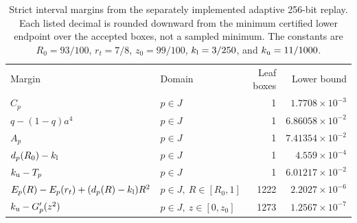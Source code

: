 \begin{table}[t]
\caption{Strict interval margins from the separately implemented adaptive 256-bit replay. Each listed decimal is rounded downward from the minimum certified lower endpoint over the accepted boxes, not a sampled minimum. The constants are $R_0=93/100$, $r_t=7/8$, $z_0=99/100$, $k_{\mathrm l}=3/250$, and $k_{\mathrm u}=11/1000$.}
\label{tab:certificate}
\begin{ruledtabular}
\begin{tabular}{llrr}
Margin & Domain & Leaf boxes & Lower bound \\
$C_p$ & $p\in J$ & 1 & $1.7708\times10^{-3}$ \\
$q-(1-q)a^4$ & $p\in J$ & 1 & $6.86058\times10^{-2}$ \\
$A_p$ & $p\in J$ & 1 & $7.41354\times10^{-2}$ \\
$d_p(R_0)-k_{\mathrm l}$ & $p\in J$ & 1 & $4.559\times10^{-4}$ \\
$k_{\mathrm u}-T_p$ & $p\in J$ & 1 & $6.01217\times10^{-2}$ \\
$E_p(R)-E_p(r_t)+(d_p(R)-k_{\mathrm l})R^2$ & $p\in J,\ R\in[R_0,1]$ & 1222 & $2.2027\times10^{-6}$ \\
$k_{\mathrm u}-G_p^{\prime}(z^2)$ & $p\in J,\ z\in[0,z_0]$ & 1273 & $1.2567\times10^{-7}$ \\
\end{tabular}
\end{ruledtabular}
\end{table}
